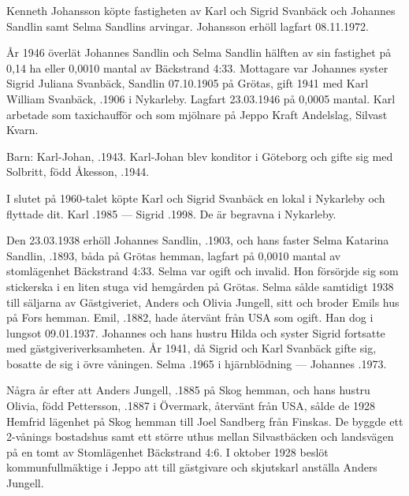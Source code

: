 

%
Kenneth Johansson köpte fastigheten av Karl och Sigrid Svanbäck	och Johannes Sandlin samt Selma Sandlins arvingar. Johansson erhöll lagfart 08.11.1972.


%
År 1946 överlät Johannes Sandlin och Selma Sandlin hälften av sin	fastighet på 0,14 ha eller 0,0010 mantal av Bäckstrand 4:33. Mottagare	var Johannes syster Sigrid Juliana Svanbäck, \textborn Sandlin	07.10.1905 på Grötas, gift 1941 med Karl William Svanbäck, .1906 i Nykarleby. Lagfart 23.03.1946 på 0,0005 mantal. Karl arbetade som taxichaufför och som mjölnare på Jeppo Kraft Andelslag, Silvast Kvarn.

Barn:	Karl-Johan,	.1943.	Karl-Johan blev konditor i Göteborg och gifte sig med Solbritt, född	Åkesson, .1944.

I slutet på 1960-talet köpte Karl och Sigrid Svanbäck en lokal i Nykarleby och flyttade dit.
Karl .1985  ---  Sigrid .1998. De är	begravna i Nykarleby.


%
Den 23.03.1938 erhöll Johannes Sandlin, .1903, och hans faster Selma Katarina Sandlin, .1893, båda på Grötas hemman, lagfart på 0,0010 mantal av stomlägenhet Bäckstrand 4:33. Selma var ogift och invalid. Hon försörjde sig som stickerska i en	liten stuga vid hemgården på Grötas. Selma sålde samtidigt 1938	till säljarna av Gästgiveriet, Anders och Olivia Jungell, sitt och broder Emils hus på Fors hemman. Emil, .1882, hade återvänt från USA som ogift. Han dog i lungsot 09.01.1937. Johannes och hans hustru Hilda och syster Sigrid fortsatte med gästgiveriverksamheten. År 1941, då Sigrid och Karl Svanbäck gifte sig, bosatte de sig i övre våningen.
Selma .1965 i hjärnblödning  ---  Johannes .1973.


%
Några år efter att Anders Jungell, .1885 på Skog hemman,	och hans hustru Olivia, född Pettersson, .1887 i Övermark, återvänt från USA, sålde de 1928 Hemfrid lägenhet på Skog hemman till Joel Sandberg från Finskas. De byggde ett 2-vånings bostadshus samt ett	större uthus mellan Silvastbäcken och landsvägen på en tomt av Stomlägenhet Bäckstrand 4:6. I oktober 1928 beslöt kommunfullmäktige i Jeppo att till gästgivare och skjutskarl anställa Anders Jungell.

